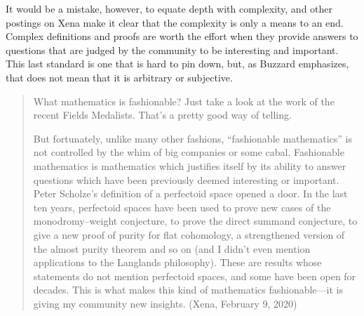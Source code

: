\documentclass[12pt]{amsart}
\theoremstyle{definition}
\theoremstyle{remark}
\numberwithin{equation}{section}
\begin{document}
It would be a mistake, however, to equate depth with complexity, and other postings on Xena make it clear that the complexity is only a means to an end. Complex definitions and proofs are worth the effort when they provide answers to questions that are judged by the community to be interesting and important. This last standard is one that is hard to pin down, but, as Buzzard emphasizes, that does not mean that it is arbitrary or subjective.

\begin{quote}
\noindent What mathematics is fashionable? Just take a look at the work of the recent Fields Medalists. That's a pretty good way of telling.

But fortunately, unlike many other fashions, ``fashionable mathematics'' is not controlled by the whim of big companies or some cabal. Fashionable mathematics is mathematics which justifies itself by its ability to answer questions which have been previously deemed interesting or important. Peter Scholze’s definition of a perfectoid space opened a door. In the last ten years, perfectoid spaces have been used to prove new cases of the monodromy--weight conjecture, to prove the direct summand conjecture, to give a new proof of purity for flat cohomology, a strengthened version of the almost purity theorem and so on (and I didn't even mention applications to the Langlands philosophy). These are results whose statements do not mention perfectoid spaces, and some have been open for decades. This is what makes this kind of mathematics fashionable---it is giving my community new insights. (Xena, February 9, 2020)
\end{quote}
\end{document}
